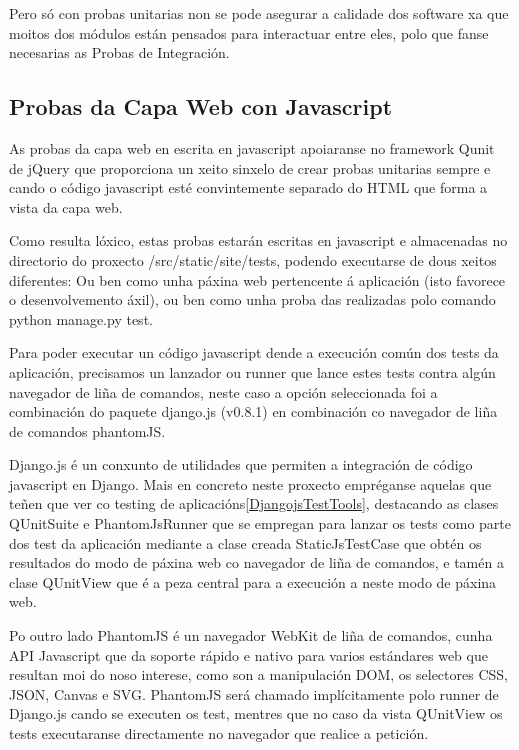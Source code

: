        Pero só con probas unitarias non se pode asegurar a calidade dos software xa que moitos dos
        módulos están pensados para interactuar entre eles, polo que fanse necesarias as Probas de
        Integración.

    \subsection{Probas da Capa Web con Javascript}
        As probas da capa web en escrita en javascript apoiaranse no framework Qunit de 
        jQuery que proporciona un xeito sinxelo de crear probas unitarias sempre e cando o código 
        javascript esté convintemente separado do HTML que forma a vista da capa web.
        
        Como resulta lóxico, estas probas estarán escritas en javascript e almacenadas no directorio
        do proxecto /src/static/site/tests, podendo executarse de dous xeitos diferentes: Ou ben 
        como unha páxina web pertencente á aplicación (isto favorece o desenvolvemento áxil), ou ben
        como unha proba das realizadas polo comando python manage.py test.
        
        Para poder executar un código javascript dende a execución común dos tests da aplicación, 
        precisamos un lanzador ou runner que lance estes tests contra algún navegador de liña de 
        comandos, neste caso a opción seleccionada foi a combinación do paquete django.js (v0.8.1)
        en combinación co navegador de liña de comandos phantomJS. 
        
        Django.js é un conxunto de utilidades que permiten a integración de código javascript en 
        Django. Mais en concreto neste proxecto empréganse aquelas que teñen que ver co testing de
        aplicacións\ref{DjangojsTestTools}, destacando as clases QUnitSuite e PhantomJsRunner que se
        empregan para lanzar os tests como parte dos test da aplicación mediante a clase creada
        StaticJsTestCase que obtén os resultados do modo de páxina web co navegador de liña de 
        comandos, e tamén a clase QUnitView que é a peza central para a execución a neste modo de
        páxina web.
        
        Po outro lado PhantomJS é un navegador WebKit de liña de comandos, cunha API Javascript que
        da soporte rápido e nativo para varios estándares web que resultan moi do noso interese,
        como son a manipulación DOM, os selectores CSS, JSON, Canvas e SVG. PhantomJS será chamado
        implícitamente polo runner de Django.js cando se executen os test, mentres que no caso da 
        vista QUnitView os tests executaranse directamente no navegador que realice a petición.

